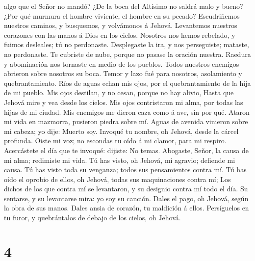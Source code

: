 algo que el Señor no mandó?  ¿De la boca del Altísimo no
saldrá malo y bueno?  ¿Por qué murmura el hombre viviente,
el hombre en su pecado?  Escudriñemos nuestros caminos, y
busquemos, y volvámonos á Jehová.  Levantemos nuestros
corazones con las manos á Dios en los cielos.  Nosotros nos
hemos rebelado, y fuimos desleales; tú no perdonaste. 
Desplegaste la ira, y nos perseguiste; mataste, no perdonaste.
 Te cubriste de nube, porque no pasase la oración nuestra.
 Raedura y abominación nos tornaste en medio de los
pueblos.  Todos nuestros enemigos abrieron sobre nosotros
su boca.  Temor y lazo fué para nosotros, asolamiento y
quebrantamiento.  Ríos de aguas echan mis ojos, por el
quebrantamiento de la hija de mi pueblo.  Mis ojos
destilan, y no cesan, porque no hay alivio,  Hasta que
Jehová mire y vea desde los cielos.  Mis ojos contristaron
mi alma, por todas las hijas de mi ciudad.  Mis enemigos me
dieron caza como á ave, sin por qué.  Ataron mi vida en
mazmorra, pusieron piedra sobre mí.  Aguas de avenida
vinieron sobre mi cabeza; yo dije: Muerto soy.  Invoqué tu
nombre, oh Jehová, desde la cárcel profunda.  Oiste mi voz;
no escondas tu oído á mi clamor, para mi respiro. 
Acercástete el día que te invoqué: dijiste: No temas. 
Abogaste, Señor, la causa de mi alma; redimiste mi vida. 
Tú has visto, oh Jehová, mi agravio; defiende mi causa.  Tú
has visto toda su venganza; todos sus pensamientos contra mí.
 Tú has oído el oprobio de ellos, oh Jehová, todas sus
maquinaciones contra mí;  Los dichos de los que contra mí
se levantaron, y su designio contra mí todo el día.  Su
sentarse, y su levantarse mira: yo soy su canción.  Dales
el pago, oh Jehová, según la obra de sus manos.  Dales
ansia de corazón, tu maldición á ellos.  Persíguelos en tu
furor, y quebrántalos de debajo de los cielos, oh Jehová.

\hypertarget{section-3}{%
\section{4}\label{section-3}}

